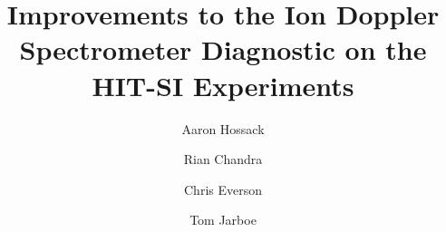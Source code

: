 \documentclass[%
aip,
rsi,%
amsmath,amssymb,
reprint,%
]{revtex4-1}
\usepackage{amsmath}
\usepackage{amssymb}
\usepackage{graphicx}
\usepackage{verbatim}
\usepackage{placeins}
\usepackage{multirow}
\usepackage{epstopdf}
\usepackage{natbib}






	\title{Improvements to the Ion Doppler Spectrometer Diagnostic on the HIT-SI Experiments}
	
	\author{Aaron Hossack}
	\author{Rian Chandra}
	\author{Chris Everson}
	\author{Tom Jarboe}
	
